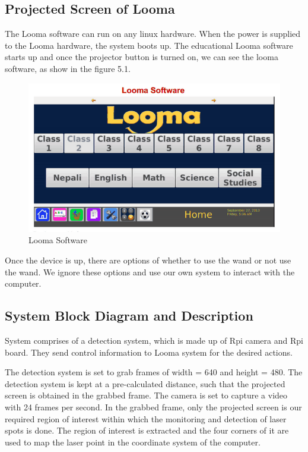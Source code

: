 \documentclass[12pt, a4paper]{article}
\begin{document}
\subsection{Projected Screen of Looma}
The Looma software can run on any linux hardware. When the power is supplied to the Looma hardware, the system boots up. The educational Looma software starts up and once the projector button is turned on, we can see the looma software, as show in the figure 5.1.
\begin{figure}[htp]
	\centering
		\includegraphics[scale=0.49]{loomasoftware.png}
	\caption{Looma Software}
\label{}
\end{figure}
Once the device is up, there are options of whether to use the wand or not use the wand. We ignore these options and use our own system to interact with the computer.


\subsection{System Block Diagram and Description}
System comprises of a detection system, which is made up of Rpi camera and Rpi board. They send control information to Looma system for the desired actions. 

The detection system is set to grab frames of width = 640 and height = 480. The detection system is kept at a pre-calculated distance, such that the projected screen is obtained in the grabbed frame. The camera is set to capture a video with 24 frames per second. In the grabbed frame, only the projected screen is our required region of interest within which the monitoring and detection of laser spots is done. The region of interest is extracted and the four corners of it are used to map the laser point in the coordinate system of the computer. 
\end{document}
